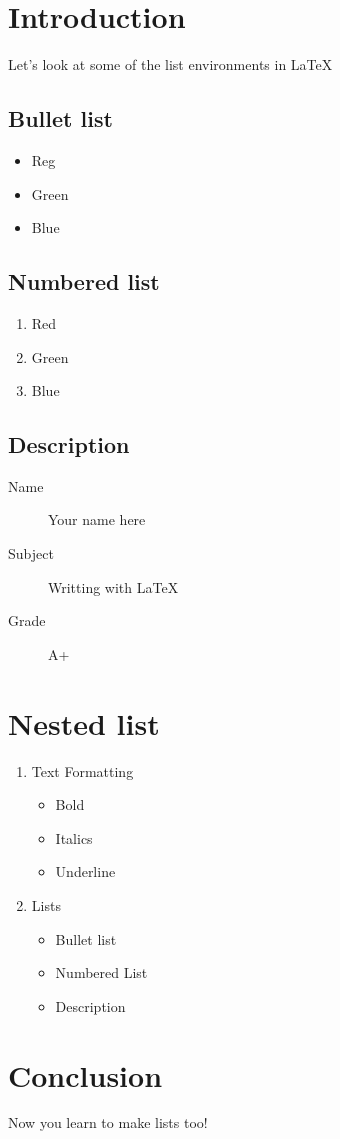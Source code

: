 \documentclass{article}
\title{}
\author{Bruno C. Messias}
\date{}
\begin{document}
\maketitle

\section{Introduction}

Let's look at some of the list environments in \LaTeX 


\subsection{Bullet list}


\begin{itemize}
    \item Reg
    \item Green
    \item Blue
\end{itemize}

\subsection{Numbered list}

\begin{enumerate}
    \item Red
    \item Green
    \item Blue
\end{enumerate}


\subsection{Description}

\begin{description}
    \item[Name] Your name here
    \item[Subject] Writting with \LaTeX
    \item[Grade] A+ 
\end{description}

\section{Nested list}

\begin{enumerate}
    \item Text Formatting
    \begin{itemize}
        \item Bold
        \item Italics
        \item Underline
    \end{itemize}
    \item Lists
    \begin{itemize}
        \item Bullet list
        \item Numbered List
        \item Description
    \end{itemize}
\end{enumerate}




\section{Conclusion}

Now you learn to make lists too!
\end{document}
